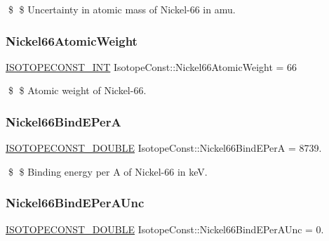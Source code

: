 \$ \$ Uncertainty in atomic mass of Nickel-\/66 in amu. \mbox{\label{group___isotope_const-_nickel-_ni66_ga95bbe3d92bbe242ac020d906da0be108}} 
\subsubsection{\texorpdfstring{Nickel66\+Atomic\+Weight}{Nickel66AtomicWeight}}
{\footnotesize\ttfamily \mbox{\hyperlink{group___isotope_const-_macros_ga5f18360b3e99483a35c32d789e62621c}{I\+S\+O\+T\+O\+P\+E\+C\+O\+N\+S\+T\+\_\+\+I\+NT}} Isotope\+Const\+::\+Nickel66\+Atomic\+Weight = 66}

\$ \$ Atomic weight of Nickel-\/66. \mbox{\label{group___isotope_const-_nickel-_ni66_ga916aab8e1422b126df8fe3dc3717280b}} 
\subsubsection{\texorpdfstring{Nickel66\+Bind\+E\+PerA}{Nickel66BindEPerA}}
{\footnotesize\ttfamily \mbox{\hyperlink{group___isotope_const-_macros_ga8f45a7272ce02c0b4c65c44636ed719a}{I\+S\+O\+T\+O\+P\+E\+C\+O\+N\+S\+T\+\_\+\+D\+O\+U\+B\+LE}} Isotope\+Const\+::\+Nickel66\+Bind\+E\+PerA = 8739.}

\$ \$ Binding energy per A of Nickel-\/66 in keV. \mbox{\label{group___isotope_const-_nickel-_ni66_gaaacdc363108c613a927f55f0074c3b96}} 
\subsubsection{\texorpdfstring{Nickel66\+Bind\+E\+Per\+A\+Unc}{Nickel66BindEPerAUnc}}
{\footnotesize\ttfamily \mbox{\hyperlink{group___isotope_const-_macros_ga8f45a7272ce02c0b4c65c44636ed719a}{I\+S\+O\+T\+O\+P\+E\+C\+O\+N\+S\+T\+\_\+\+D\+O\+U\+B\+LE}} Isotope\+Const\+::\+Nickel66\+Bind\+E\+Per\+A\+Unc = 0.}

